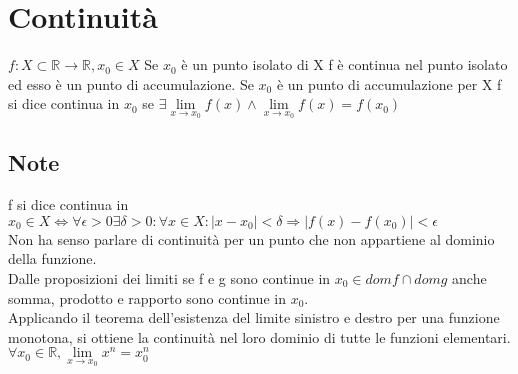 \chapter{Continuit\`a}
$f: X\subset\mathbb{R}\rightarrow\mathbb{R}, x_0\in X$ Se $x_0$ \`e un punto isolato di X f \`e continua nel punto isolato ed esso \`e un punto di accumulazione. Se $x_0$ \`e un punto di accumulazione per X f si dice continua in $x_0$ se $\exists \lim\limits_{x\rightarrow x_0} f(x)\wedge\lim\limits_{x\rightarrow x_0} f(x)=f(x_0)$
\section{Note}
f si dice continua in $x_0\in X \Leftrightarrow\forall\epsilon>0\exists\delta>0 :\forall x\in X:|x-x_0|<\delta \Rightarrow |f(x)-f(x_0)|<\epsilon$\\
Non ha senso parlare di continuit\`a per un punto che non appartiene al dominio della funzione.\\
Dalle proposizioni dei limiti se f e g sono continue in $x_0\in domf\cap domg$ anche somma, prodotto e rapporto sono continue in $x_0$.\\
Applicando il teorema dell'esistenza del limite sinistro e destro per una funzione monotona, si ottiene la continuit\`a nel loro dominio di tutte le funzioni elementari.\\
$\forall x_0\in\mathbb{R},\lim\limits_{x\rightarrow x_0} x^n=x_0^n$
